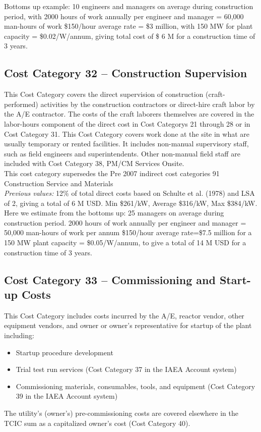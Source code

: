 Bottoms up example: 10 engineers and managers on average during construction period, with 2000 hours of work annually per engineer and manager = 60,000 man-hours of work \$150/hour average rate = \$3 million, with 150 MW for plant capacity = \$0.02/W/annum, giving total cost of \$ 6 M for a construction time of 3 years.


\subsection*{Cost Category 32 – Construction Supervision}
This Cost Category covers the direct supervision of construction (craft-performed) activities by the construction contractors or direct-hire craft labor by the A/E contractor. The costs of the craft laborers themselves are covered in the labor-hours component of the direct cost in Cost Categorys 21 through 28 or in Cost Category 31. This Cost Category covers work done at the site in what are usually temporary or rented facilities. It includes non-manual supervisory staff, such as field engineers and superintendents. Other non-manual field staff are included with Cost Category 38, PM/CM Services Onsite.\\

This cost category supersedes the Pre 2007 indirect cost categories 91 Construction Service and Materials  \\

\emph{Previous values: } 
12\% of total direct costs based on Schulte et al. (1978) and LSA of 2, giving a total of 6 M USD. Min \$261/kW, Average \$316/kW, Max \$384/kW. \\

Here we estimate from the bottoms up: 25 managers on average during construction period. 2000 hours of work annually per engineer and manager = 50,000 man-hours of work per annum \$150/hour average rate=\$7.5 million for a 150 MW plant capacity = \$0.05/W/annum, to give a total of 14 M USD for a construction time of 3 years.

\subsection*{Cost Category 33 – Commissioning and Start-up Costs}
This Cost Category includes costs incurred by the A/E, reactor vendor, other equipment vendors, and owner or owner’s representative for startup of the plant including:
\begin{itemize}
    \item Startup procedure development
    \item Trial test run services (Cost Category 37 in the IAEA Account system)
    \item Commissioning materials, consumables, tools, and equipment (Cost Category 39 in the IAEA Account system)
\end{itemize}
The utility’s (owner’s) pre-commissioning costs are covered elsewhere in the TCIC sum as a capitalized owner’s cost (Cost Category 40).

